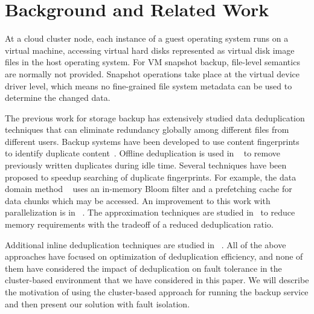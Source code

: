 \section{Background and Related Work}
\label{sect:background}
At a cloud cluster node, each instance of a guest operating system runs on a virtual machine, accessing virtual hard disks 
represented as virtual disk image files in the host operating system.
For VM snapshot backup, file-level semantics are normally not provided.
Snapshot operations take place at the virtual device driver level, which
means no fine-grained file system metadata can be used to determine the changed data. 

The previous work for storage backup has extensively studied  data deduplication techniques that
can eliminate redundancy 
globally among different files from different users.
Backup systems have been developed to use content fingerprints to identify duplicate
content~\cite{venti02,Rhea2008}.  Offline deduplication is 
used in ~\cite{EMC,NetAppOffline} to remove previously written duplicates during idle time.
Several techniques have been proposed to speedup searching of duplicate
fingerprints. For example, the data domain method ~\cite{bottleneck08} 
uses  an in-memory Bloom filter and a prefetching cache for data chunks  which may be
accessed.  An improvement to this work with parallelization is in ~\cite{MAD210,DEBAR}.
The approximation techniques are studied in~\cite{extreme_binning09,Guo2011,WeiZhangIEEE}  
to reduce memory requirements with the tradeoff of a reduced deduplication ratio.

Additional inline deduplication techniques are studied in ~\cite{sparseindex09,Guo2011,idedup}. 
All of the above approaches have focused on optimization of deduplication
efficiency, and none of them have considered the impact
of deduplication on fault tolerance in the cluster-based environment that we have considered
in this paper.
We will describe the motivation of using the cluster-based   approach
for running the backup service and then present our solution  with fault isolation.
